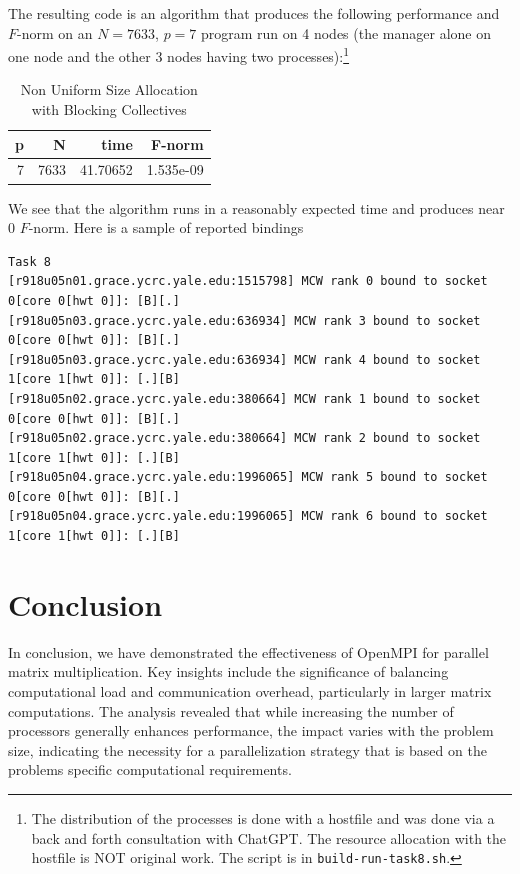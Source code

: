 \documentclass{article}
\begin{document}
\begin{itemize}
\end{itemize}
The resulting code is an algorithm that produces the following performance and 
$F$-norm on an $N = 7633$, $p = 7$ program run on 4 nodes (the manager alone 
on one node and the other 3 nodes having two processes):\footnote{
    The distribution of the processes is done with a hostfile and was done via 
    a back and forth consultation with ChatGPT. The resource allocation with the 
    hostfile is NOT original work. The script is in \texttt{build-run-task8.sh}.
}
\begin{table}[H]
    \centering
    \caption{Non Uniform Size Allocation with Blocking Collectives}
    \fontsize{12}{14}\selectfont
    \begin{tabular}[t]{rrrr}
    \toprule
    p & N & time & F-norm\\
    \midrule
    7 & 7633 & 41.70652 & 1.535e-09\\
    \bottomrule
    \end{tabular}
\end{table}
\noindent We see that the algorithm runs in a reasonably expected time and produces near 0 $F$-norm.
Here is a sample of reported bindings
\begin{verbatim}
Task 8
[r918u05n01.grace.ycrc.yale.edu:1515798] MCW rank 0 bound to socket 0[core 0[hwt 0]]: [B][.]
[r918u05n03.grace.ycrc.yale.edu:636934] MCW rank 3 bound to socket 0[core 0[hwt 0]]: [B][.]
[r918u05n03.grace.ycrc.yale.edu:636934] MCW rank 4 bound to socket 1[core 1[hwt 0]]: [.][B]
[r918u05n02.grace.ycrc.yale.edu:380664] MCW rank 1 bound to socket 0[core 0[hwt 0]]: [B][.]
[r918u05n02.grace.ycrc.yale.edu:380664] MCW rank 2 bound to socket 1[core 1[hwt 0]]: [.][B]
[r918u05n04.grace.ycrc.yale.edu:1996065] MCW rank 5 bound to socket 0[core 0[hwt 0]]: [B][.]
[r918u05n04.grace.ycrc.yale.edu:1996065] MCW rank 6 bound to socket 1[core 1[hwt 0]]: [.][B]
\end{verbatim}

\section{Conclusion}
In conclusion, we have demonstrated the effectiveness of OpenMPI for parallel matrix multiplication.
Key insights include the significance of balancing computational load and communication overhead, 
particularly in larger matrix computations. The analysis revealed that while increasing the 
number of processors generally enhances performance, the impact varies with the problem size, 
indicating the necessity for a parallelization strategy that is based on the problems
specific computational requirements. 
\end{document}
